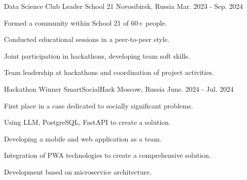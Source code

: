 \begin{cventries}

  \cventry
    {Data Science Club Leader} %
    {School 21} %
    {Novosibirsk, Russia} %
    {Mar. 2023 - Sep. 2024} %
    {
      \begin{cvitems} %
        \item {Formed a community within School 21 of 60+ people.}
        \item {Conducted educational sessions in a peer-to-peer style.}
        \item {Joint participation in hackathons, developing team soft skills.}
        \item {Team leadership at hackathons and coordination of project activities.}
      \end{cvitems}
    }

  \cventry
    {Hackathon Winner} %
    {SmartSocialHack} %
    {Moscow, Russia} %
    {June. 2024 - Jul. 2024} %
    {
      \begin{cvitems} %
        \item {First place in a case dedicated to socially significant problems.}
        \item {Using LLM, PostgreSQL, FastAPI to create a solution.}
        \item {Developing a mobile and web application as a team.}
        \item {Integration of PWA technologies to create a comprehensive solution.}
        \item {Development based on microservice architecture.}
      \end{cvitems}
    }

\end{cventries}